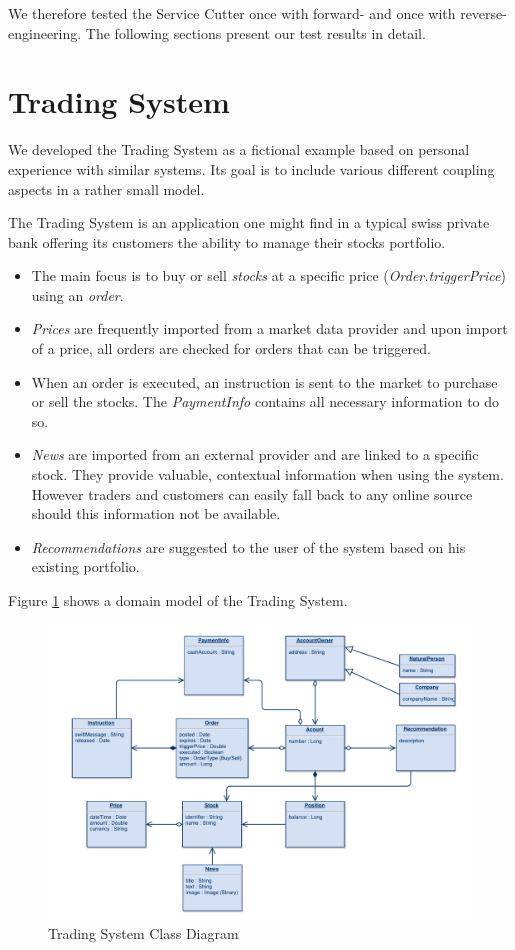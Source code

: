 We therefore tested the Service Cutter once with forward- and once with reverse-engineering. The following sections present our test results in detail.

\section{Trading System}
\label{sec:tradingSystem}

We developed the Trading System as a fictional example based on personal experience with similar systems. Its goal is to include various different coupling aspects in a rather small model.

The Trading System is an application one might find in a typical swiss private bank offering its customers the ability to manage their stocks portfolio.

\begin{itemize}
\item The main focus is to buy or sell \textit{stocks} at a specific price (\textit{Order.triggerPrice}) using an \textit{order}.
\item \textit{Prices} are frequently imported from a market data provider and upon import of a price, all orders are checked for orders that can be triggered.
\item When an order is executed, an instruction is sent to the market to purchase or sell the stocks. The \textit{PaymentInfo} contains all necessary information to do so. 
\item \textit{News} are imported from an external provider and are linked to a specific stock. They provide valuable, contextual information when using the system. However traders and customers can easily fall back to any online source should this information not be available.
\item \textit{Recommendations} are suggested to the user of the system based on his existing portfolio.
\end{itemize}

Figure \ref{fig:tradingClasses} shows a domain model of the Trading System.

\begin{figure}[H]
	\includegraphics[scale=0.5]{diagrams/TradingSystem.pdf}
	\caption{Trading System Class Diagram}
	\label{fig:tradingClasses}
\end{figure}

